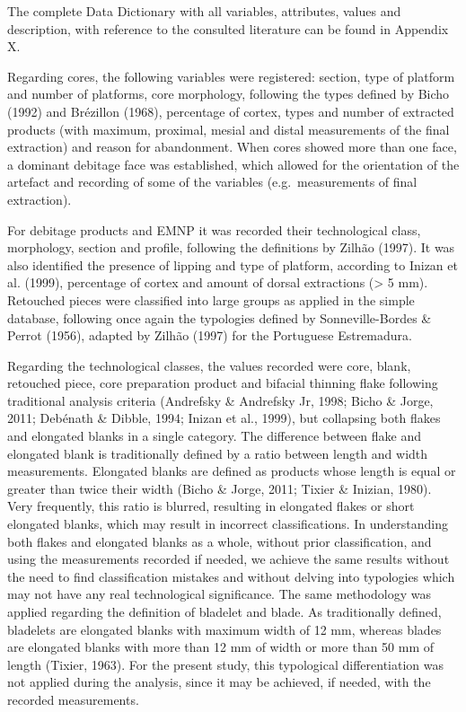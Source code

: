 \documentclass[12pt,twoside]{reedthesis}
\begin{document}
The complete Data Dictionary with all variables, attributes, values and description, with reference to the consulted literature can be found in Appendix X.

Regarding cores, the following variables were registered: section, type of platform and number of platforms, core morphology, following the types defined by Bicho (1992) and Brézillon (1968), percentage of cortex, types and number of extracted products (with maximum, proximal, mesial and distal measurements of the final extraction) and reason for abandonment. When cores showed more than one face, a dominant debitage face was established, which allowed for the orientation of the artefact and recording of some of the variables (e.g.~measurements of final extraction).

For debitage products and EMNP it was recorded their technological class, morphology, section and profile, following the definitions by Zilhão (1997). It was also identified the presence of lipping and type of platform, according to Inizan et al. (1999), percentage of cortex and amount of dorsal extractions (\textgreater{} 5 mm). Retouched pieces were classified into large groups as applied in the simple database, following once again the typologies defined by Sonneville-Bordes \& Perrot (1956), adapted by Zilhão (1997) for the Portuguese Estremadura.

Regarding the technological classes, the values recorded were core, blank, retouched piece, core preparation product and bifacial thinning flake following traditional analysis criteria (Andrefsky \& Andrefsky Jr, 1998; Bicho \& Jorge, 2011; Debénath \& Dibble, 1994; Inizan et al., 1999), but collapsing both flakes and elongated blanks in a single category. The difference between flake and elongated blank is traditionally defined by a ratio between length and width measurements. Elongated blanks are defined as products whose length is equal or greater than twice their width (Bicho \& Jorge, 2011; Tixier \& Inizian, 1980). Very frequently, this ratio is blurred, resulting in elongated flakes or short elongated blanks, which may result in incorrect classifications. In understanding both flakes and elongated blanks as a whole, without prior classification, and using the measurements recorded if needed, we achieve the same results without the need to find classification mistakes and without delving into typologies which may not have any real technological significance. The same methodology was applied regarding the definition of bladelet and blade. As traditionally defined, bladelets are elongated blanks with maximum width of 12 mm, whereas blades are elongated blanks with more than 12 mm of width or more than 50 mm of length (Tixier, 1963). For the present study, this typological differentiation was not applied during the analysis, since it may be achieved, if needed, with the recorded measurements.
\end{document}
